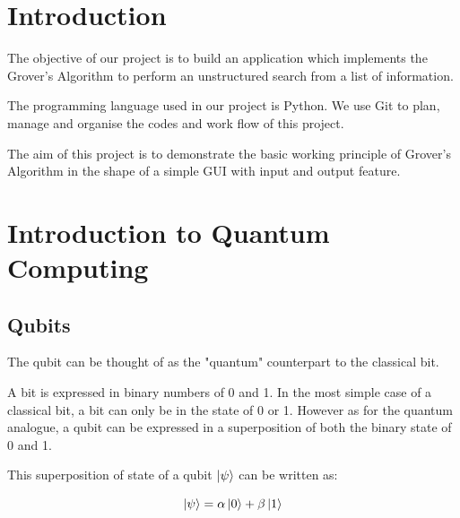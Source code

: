 \documentclass{article}
\begin{document}
\vspace{10mm}

\section*{Introduction} %
\vspace{10mm}

The objective of our project is to build an application which implements the Grover's Algorithm to perform an unstructured search from a list of information.
\vspace{5mm}

\noindent
The programming language used in our project is Python. We use Git to plan, manage and organise the codes and work flow of this project. 
\vspace{5mm}

\noindent
The aim of this project is to demonstrate the basic working principle of Grover's Algorithm in the shape of a simple GUI with input and output feature.
\pagebreak

\tableofcontents %
\pagebreak

\section{Introduction to Quantum Computing}
\vspace{5mm}

\subsection{Qubits}
\vspace{5mm}

The qubit can be thought of as the "quantum" counterpart to the classical bit. 
\vspace{5mm}

\noindent
A bit is expressed in binary numbers of 0 and 1. In the most simple case of a classical bit, a bit can only be in the state of 0 or 1. However as for the quantum analogue, a qubit can be expressed in a superposition of both the binary state of 0 and 1.
\vspace{5mm}

\noindent
This superposition of state of a qubit $\ket{\psi}$ can be written as:
\vspace{5mm}

\begin{equation}
     \ket{\psi} = \alpha\ket{0} + \beta\ket{1}
\end{equation}
\vspace{5mm}
\end{document}
